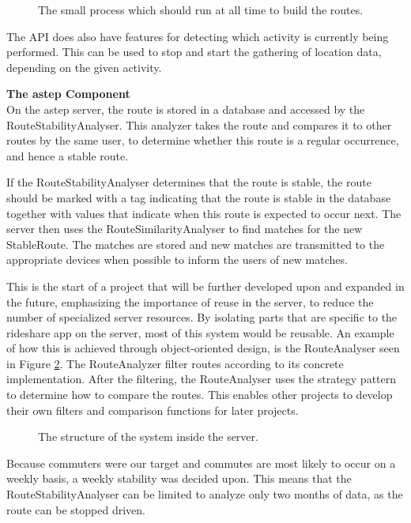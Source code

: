 \begin{figure}[h]
	\centering
	
	\caption{The small process which should run at all time to build the routes.}
	\label{fig:classDiagramSprint1Observer}
\end{figure}

The API does also have features for detecting which activity is currently being performed.
This can be used to stop and start the gathering of location data, depending on the given activity.

\textbf{The \gls{astep} Component}\\
On the \gls{astep} server, the route is stored in a database and accessed by the RouteStabilityAnalyser.
This analyzer takes the route and compares it to other routes by the same user, to determine whether this route is a regular occurrence, and hence a stable route.

If the RouteStabilityAnalyser determines that the route is stable, the route should be marked with a tag indicating that the route is stable in the database together with values that indicate when this route is expected to occur next.
The server then uses the RouteSimilarityAnalyser to find matches for the new StableRoute.
The matches are stored and new matches are transmitted to the appropriate devices when possible to inform the users of new matches.

%	

This is the start of a project that will be further developed upon and expanded in the future, emphasizing the importance of reuse in the server, to reduce the number of specialized server resources.
By isolating parts that are specific to the rideshare app on the server, most of this system would be reusable.
An example of how this is achieved through object-oriented design, is the RouteAnalyser seen in Figure \ref{fig:classDiagramSprint1Server}.
The RouteAnalyzer filter routes according to its concrete implementation.
After the filtering, the RouteAnalyser uses the strategy pattern to determine how to compare the routes.
This enables other projects to develop their own filters and comparison functions for later projects.

\begin{figure}[h!]
	\centering
	
	\caption{The structure of the system inside the server.}
	\label{fig:classDiagramSprint1Server}
\end{figure}

Because commuters were our target and commutes are most likely to occur on a weekly basis, a weekly stability was decided upon.
This means that the RouteStabilityAnalyser can be limited to analyze only two months of data, as the route can be stopped driven.